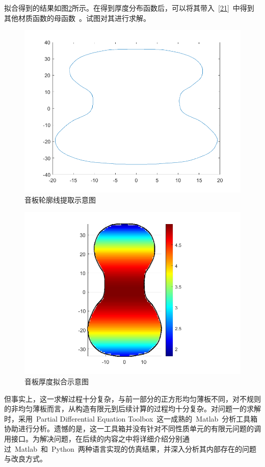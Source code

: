 \documentclass[withoutpreface,bwprint]{cumcmthesis} %
\begin{document}
拟合得到的结果如图\ref{fig-9}所示。在得到厚度分布函数后，可以将其带入~\eqref{21}~中得到其他材质函数的母函数~\cite{ref7}\cite{ref8}。试图对其进行求解。
\newpage
\begin{figure}[htbp]
\centering %
\includegraphics[width=0.45\linewidth]{CUMCMThesis-master/figures/Shape.png}\caption{音板轮廓线提取示意图}
\label{fig-8}
\end{figure}
\begin{figure}[htbp]
\centering %
\includegraphics[width=0.8\linewidth]{CUMCMThesis-master/figures/hou.png}\caption{音板厚度拟合示意图}
\label{fig-9}
\end{figure}

但事实上，这一求解过程十分复杂，与前一部分的正方形均匀薄板不同，对不规则的非均匀薄板而言，从构造有限元到后续计算的过程均十分复杂。对问题一的求解时，采用~Partial Differential Equation Toolbox~这一成熟的~Matlab~分析工具箱协助进行分析。遗憾的是，这一工具箱并没有针对不同性质单元的有限元问题的调用接口。为解决问题，在后续的内容之中将详细介绍分别通过~Matlab~和~Python~两种语言实现的仿真结果，并深入分析其内部存在的问题与改良方式。
\end{document}
